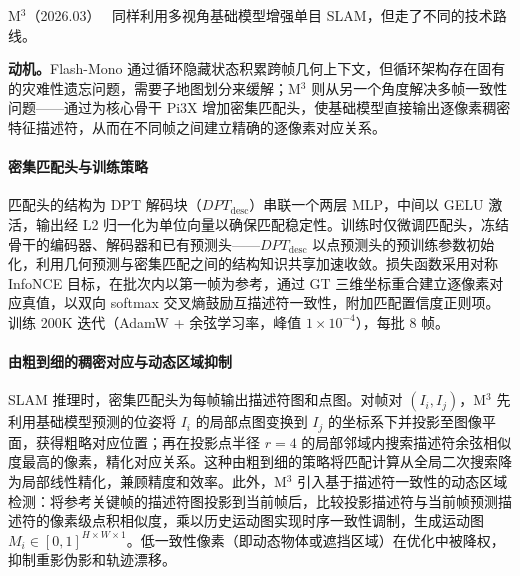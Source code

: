 M$^3$（2026.03）~\cite{2603_16844} 同样利用多视角基础模型增强单目 SLAM，但走了不同的技术路线。

\textbf{动机。}Flash-Mono 通过循环隐藏状态积累跨帧几何上下文，但循环架构存在固有的灾难性遗忘问题，需要子地图划分来缓解；M$^3$ 则从另一个角度解决多帧一致性问题——通过为核心骨干 Pi3X 增加密集匹配头，使基础模型直接输出逐像素稠密特征描述符，从而在不同帧之间建立精确的逐像素对应关系。

\paragraph{密集匹配头与训练策略}匹配头的结构为 DPT 解码块（$DPT_\mathrm{desc}$）串联一个两层 MLP，中间以 GELU 激活，输出经 L2 归一化为单位向量以确保匹配稳定性。训练时仅微调匹配头，冻结骨干的编码器、解码器和已有预测头——$DPT_\mathrm{desc}$ 以点预测头的预训练参数初始化，利用几何预测与密集匹配之间的结构知识共享加速收敛。损失函数采用对称 InfoNCE 目标，在批次内以第一帧为参考，通过 GT 三维坐标重合建立逐像素对应真值，以双向 softmax 交叉熵鼓励互描述符一致性，附加匹配置信度正则项。训练 200K 迭代（AdamW + 余弦学习率，峰值 $1 \times 10^{-4}$），每批 8 帧。

\paragraph{由粗到细的稠密对应与动态区域抑制}SLAM 推理时，密集匹配头为每帧输出描述符图和点图。对帧对 $(I_i, I_j)$，M$^3$ 先利用基础模型预测的位姿将 $I_i$ 的局部点图变换到 $I_j$ 的坐标系下并投影至图像平面，获得粗略对应位置；再在投影点半径 $r=4$ 的局部邻域内搜索描述符余弦相似度最高的像素，精化对应关系。这种由粗到细的策略将匹配计算从全局二次搜索降为局部线性精化，兼顾精度和效率。此外，M$^3$ 引入基于描述符一致性的动态区域检测：将参考关键帧的描述符图投影到当前帧后，比较投影描述符与当前帧预测描述符的像素级点积相似度，乘以历史运动图实现时序一致性调制，生成运动图 $M_i \in [0,1]^{H \times W \times 1}$。低一致性像素（即动态物体或遮挡区域）在优化中被降权，抑制重影伪影和轨迹漂移。

